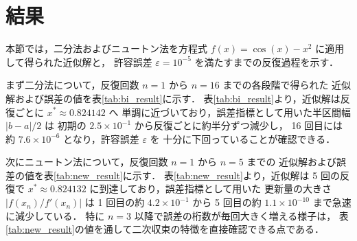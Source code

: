 \documentclass[a4paper,fontsize=11pt,line_length=40zw,number_of_lines=35,baselineskip=1.7zw]{jlreq}
\begin{document}
\section{結果}
本節では，二分法およびニュートン法を方程式 $f(x)=\cos(x)-x^2$ に適用して得られた近似解と，
許容誤差 $\varepsilon = 10^{-5}$ を満たすまでの反復過程を示す．

まず二分法について，反復回数 $n=1$ から $n=16$ までの各段階で得られた
近似解および誤差の値を表\ref{tab:bi_result}に示す．
表\ref{tab:bi_result}より，近似解は反復ごとに $x^*\approx 0.824142$ へ
単調に近づいており，誤差指標として用いた半区間幅 $|b-a|/2$ は
初期の $2.5\times 10^{-1}$ から反復ごとに約半分ずつ減少し，
16 回目には約 $7.6\times 10^{-6}$ となり，許容誤差 $\varepsilon$ を
十分に下回っていることが確認できる．

\begin{table}[htbp]
  \centering
  \caption{%
    二分法による方程式 $f(x)=\cos(x)-x^2$ の零点 $x^*\in(0.5,1)$ に対する反復過程の記録．
    初期区間を $[a_0,b_0]=[0.5,1]$（ただし $f(a_0)f(b_0)<0$ を満たす）とし，
    収束判定の許容誤差を $\varepsilon=10^{-5}$ として，半区間幅 $|b_n-a_n|/2$ が $\varepsilon$ 以下となるまで反復を行った．
    各行は反復回数 $n$，中点として得られた近似解 $c_n=(a_n+b_n)/2$，
    および誤差の代理指標として用いた半区間幅 $|b_n-a_n|/2$ を示す．
    16 回目の反復において近似解は $x_{16}\approx 8.241425\times 10^{-1}$ に到達し，
    半区間幅は約 $7.6\times 10^{-6}$ となって許容誤差を下回った．
    計算はC言語（\texttt{gcc}コンパイラ，\texttt{math.h}標準ライブラリ使用）により実施した．
  }
  \label{tab:bi_result}
\end{table}

次にニュートン法について，反復回数 $n=1$ から $n=5$ までの
近似解および誤差の値を表\ref{tab:new_result}に示す．
表\ref{tab:new_result}より，近似解は 5 回の反復で
$x^*\approx 0.824132$ に到達しており，誤差指標として用いた
更新量の大きさ $|f(x_n)/f'(x_n)|$ は 1 回目の約 $4.2\times 10^{-1}$ から
5 回目の約 $1.1\times 10^{-10}$ まで急速に減少している．
特に $n=3$ 以降で誤差の桁数が毎回大きく増える様子は，
表\ref{tab:new_result}の値を通して二次収束の特徴を直接確認できる点である．

\begin{table}[htbp]
  \centering
  \caption{%
    ニュートン法による方程式 $f(x)=\cos(x)-x^2$ の零点 $x^*\in(0.5,1)$ に対する反復過程の記録．
    初期値を $x_0=0.8$（図\ref{fig:fn_f}に示した解の存在区間の中央付近から選定）とし，
    更新式 $x_{n+1}=x_n-f(x_n)/f'(x_n)$（式(\ref{eq:newt_step})）に従って反復を行った．
    導関数は $f'(x)=-\sin(x)-2x$ として解析的に計算し，収束判定の許容誤差は二分法と同一の $\varepsilon=10^{-5}$ とした．
    各行は反復回数 $n$，近似解 $x_n$，
    および誤差の代理指標として用いた更新量の大きさ $|f(x_n)/f'(x_n)|$ を示す．
    誤差指標は 1 回目の反復における約 $4.2\times 10^{-1}$ から，
    5 回目の反復では約 $1.1\times 10^{-10}$ まで急激に減少しており，
    反復回数ごとに有効桁数がおよそ倍増するという二次収束の特徴的なパターンが表中に直接確認できる．
  }
  \label{tab:new_result}
\end{table}
\end{document}
